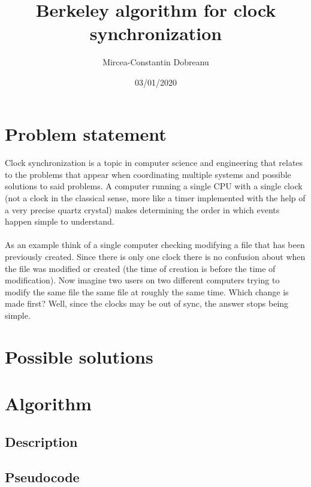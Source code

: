 \documentclass[12pt]{article}
\title{Berkeley algorithm for clock synchronization}
\author{Mircea-Constantin Dobreanu}
\date{03/01/2020}
\begin{document}
\maketitle

\section{Problem statement}

\paragraph{}
Clock synchronization is a topic in computer science and engineering that relates to the problems that appear when coordinating multiple systems and possible solutions to said problems. A computer running a single CPU with a single clock (not a clock in the classical sense, more like a timer implemented with the help of a very precise quartz crystal) makes determining the order in which events happen simple to understand. 

\paragraph{}
As an example think of a single computer checking modifying a file that has been previously created. Since there is only one clock there is no confusion about when the file was modified or created (the time of creation is before the time of modification). Now imagine two users on two different computers trying to modify the same file the same file at roughly the same time. Which change is made first? Well, since the clocks may be out of sync, the answer stops being simple.

\section{Possible solutions}

\section{Algorithm}

\subsection{Description}

\subsection{Pseudocode}
\end{document}
